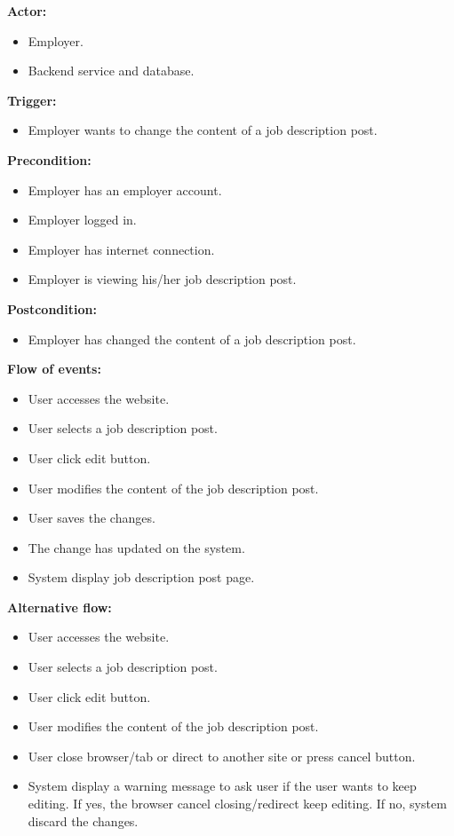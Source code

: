 \documentclass[a4paper]{article}
\begin{document}
\textbf{Actor:}
\begin{itemize}
    \item Employer.
    \item Backend service and database.
\end{itemize}

\textbf{Trigger:}
\begin{itemize}
    \item Employer wants to change the content of a job description post.
\end{itemize}

\textbf{Precondition:}
\begin{itemize}
    \item Employer has an employer account.
    \item Employer logged in.
    \item Employer has internet connection.
    \item Employer is viewing his/her job description post.
\end{itemize}

\textbf{Postcondition:}
\begin{itemize}
    \item Employer has changed the content of a job description post.
\end{itemize}

\textbf{Flow of events:}
\begin{itemize}
    \item User accesses the website.
    \item User selects a job description post.
    \item User click edit button.
    \item User modifies the content of the job description post.
    \item User saves the changes.
    \item The change has updated on the system.
    \item System display job description post page.
\end{itemize}

\textbf{Alternative flow:}
\begin{itemize}
    \item User accesses the website.
    \item User selects a job description post.
    \item User click edit button.
    \item User modifies the content of the job description post.
    \item User close browser/tab or direct to another site or press cancel button.
    \item System display a warning message to ask user if the user wants to keep editing. If yes, the browser cancel closing/redirect keep editing. If no, system discard the changes.
\end{itemize}
\end{document}
